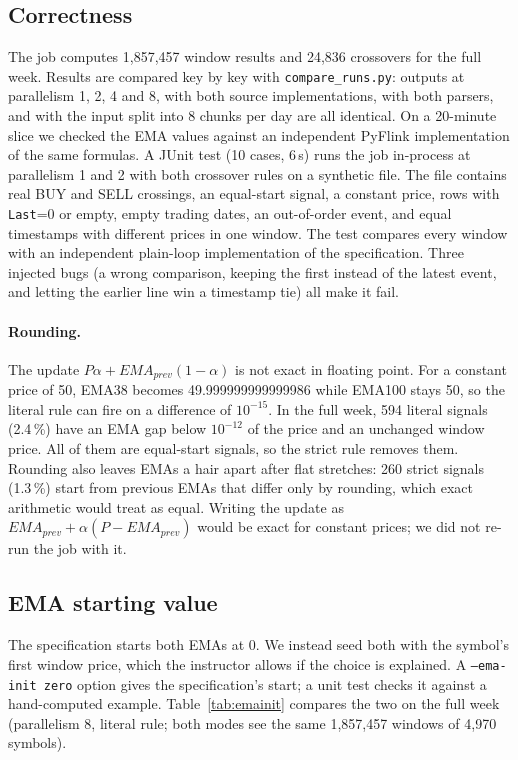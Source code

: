 \documentclass[sigconf,nonacm]{acmart}
\begin{document}
\subsection{Correctness}\label{sec:correct}
The job computes 1,857,457 window results and 24,836 crossovers for the full
week. Results are compared key by key with \texttt{compare\_runs.py}: outputs at
parallelism 1, 2, 4 and 8, with both source implementations, with both parsers,
and with the input split into 8 chunks per day are all identical. On a
20-minute slice we checked the EMA values against an independent PyFlink
implementation of the same formulas. A JUnit test (10 cases, 6\,s) runs the job
in-process at parallelism 1 and 2 with both crossover rules on a synthetic file.
The file contains real BUY and SELL crossings, an equal-start signal, a constant
price, rows with \texttt{Last}=0 or empty, empty trading dates, an
out-of-order event, and equal timestamps with different prices in one window. The test compares every window with an independent plain-loop
implementation of the specification. Three injected bugs (a wrong comparison,
keeping the first instead of the latest event, and letting the earlier line win
a timestamp tie) all make it fail.

\paragraph{Rounding.} The update $P\alpha + \mathit{EMA}_\mathit{prev}(1-\alpha)$
is not exact in floating point. For a constant price of 50, EMA38 becomes
49.999999999999986 while EMA100 stays 50, so the literal rule can fire on a
difference of $10^{-15}$. In the full week, 594 literal signals (2.4\,\%) have an
EMA gap below $10^{-12}$ of the price and an unchanged window price. All of them
are equal-start signals, so the strict rule removes them. Rounding also leaves
EMAs a hair apart after flat stretches: 260 strict signals (1.3\,\%) start from
previous EMAs that differ only by rounding, which exact arithmetic would treat as
equal. Writing the update as $\mathit{EMA}_\mathit{prev} + \alpha(P-\mathit{EMA}_\mathit{prev})$
would be exact for constant prices; we did not re-run the job with it.

\subsection{EMA starting value}\label{sec:emainit}
The specification starts both EMAs at 0. We instead seed both with the symbol's
first window price, which the instructor allows if the choice is explained. A
\texttt{--ema-init zero} option gives the specification's start; a unit test
checks it against a hand-computed example. Table~\ref{tab:emainit} compares the
two on the full week (parallelism 8, literal rule; both modes see the same
1,857,457 windows of 4,970 symbols).
\end{document}

